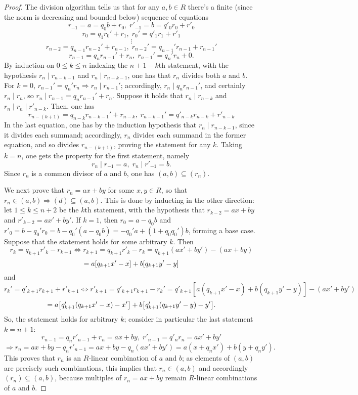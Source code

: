 \documentclass{article}
\begin{document}
\begin{proof}
  The division algorithm tells us that for any $a, b \in R$ there's a finite
  (since the norm is decreasing and bounded below) sequence of equations
  \[
    r_{-1} = a = q_{0}b + r_{0}, \; r'_{-1} = b = q'_{0}r_{0} + r'_{0}
  \]
  \[
    r_{0} = q_{1}r_{0}' + r_{1}, \; r_{0}' = q'_{1}r_{1} + r'_{1}
  \]
  \[
    \vdots
  \]
  \[
    r_{n-2} = q_{n-1}r_{n-2}' + r_{n-1}, \; r_{n-2}' = q_{n-1}'r_{n-1} + r_{n-1}'
  \]
  \[
    r_{n-1} = q_{n}r_{n-1}' + r_{n}, \; r_{n-1}' = q_{n}'r_{n} + 0.
  \]
  By induction on $0 \leq k \leq n$ indexing the $n + 1 - k$th statement, with the hypothesis $r_{n} \mid r_{n - k - 1}$ and $r_{n} \mid r_{n - k -1}$,
  one has that $r_{n}$ divides both $a$ and $b$.
  For $k = 0$, $r_{n-1}' = q_{n}'r_{n} \Rightarrow r_{n} \mid r_{n-1}'$;
  accordingly, $r_{n} \mid q_{n}r_{n-1}'$, and certainly $r_{n} \mid r_{n}$, so $r_{n} \mid r_{n-1} = q_{n}r_{n-1}' + r_{n}$.
  Suppose it holds that $r_{n} \mid r_{n - k}$ and $r_{n} \mid r_{n} \mid r'_{n - k}$.
  Then, one has
  \[
    r_{n - (k + 1)} = q_{n - k}r_{n - k - 1}' + r_{n - k}, \; r_{n - k - 1}' = q'_{n - k}r_{n - k} + r'_{n - k}
  \]
  In the last equation, one has by the induction hypothesis that $r_{n} \mid r_{n - k - 1}$, since it divides each summand;
  accordingly, $r_{n}$ divides each summand in the former equation, and so divides $r_{n - (k + 1)}$, proving the statement for any $k$.
  Taking $k = n$, one gets the property for the first statement, namely
  \[
    r_{n} \mid r_{-1} = a, \; r_{n} \mid r'_{-1} = b.
  \]
  Since $r_{n}$ is a common divisor of $a$ and $b$, one has $(a, b) \subseteq (r_{n})$.

  We next prove that $r_{n} = ax + by$ for some $x, y \in R$, so that $r_{n} \in (a, b) \Rightarrow (d) \subseteq (a, b)$.
  This is done by inducting in the other direction: let $1 \leq k \leq n + 2$ be the $k$th statement,
  with the hypothesis that $r_{k - 2} = ax + by$ and $r'_{k - 2} = ax' + by'$.
  If $k = 1$, then $r_{0} = a - q_{0}b$ and $r'_{0} = b - q_{0}'r_{0} = b - q_{0}'(a - q_{0}b) = -q_{0}'a + (1 + q_{0}q_{0}')b$, forming a base case.
  Suppose that the statement holds for some arbitrary $k$.
  Then
  \[
    r_{k} = q_{k + 1}r'_{k} - r_{k + 1} \Leftrightarrow r_{k + 1} = q_{k + 1}r'_{k} - r_{k} = q_{k + 1}(ax' + by') - (ax + by)
  \]
  \[
    = a\qty[q_{k + 1}x' - x] + b\qty[q_{k + 1}y' - y]
  \]
  and
  \[
    r_{k}' = q'_{k + 1}r_{k + 1} + r'_{k + 1} \Leftrightarrow r'_{k + 1} = q'_{k + 1}r_{k + 1} - r_{k}' = q'_{k + 1}[a(q_{k + 1}x' - x) + b(q_{k + 1}y' - y)]
    - (ax' + by')
  \]
  \[
    = a\qty[q'_{k + 1}(q_{k + 1}x' - x) - x'] + b\qty[q'_{k + 1}(q_{k + 1}y' - y) - y'].
  \]
  So, the statement holds for arbitrary $k$; consider in particular the last statement $k = n + 1$:
  \[
    r_{n - 1} = q_{n}r'_{n - 1} + r_{n} = ax + by, \; r'_{n - 1} = q'_{n}r_{n} = ax' + by'
  \]
  \[
    \Rightarrow r_{n} = ax + by  - q_{n}r'_{n - 1} = ax + by - q_{n}(ax' + by') = a(x + q_{n}x') + b(y + q_{n}y').
  \]
  This proves that $r_{n}$ is an $R$-linear combination of $a$ and $b$; as elements of $(a, b)$ are precisely such combinations,
  this implies that $r_{n} \in (a, b)$ and accordingly $(r_{n}) \subseteq (a, b)$,
  because multiples of $r_{n} = ax + by$ remain $R$-linear combinations of $a$ and $b$.


\end{proof}
\end{document}
